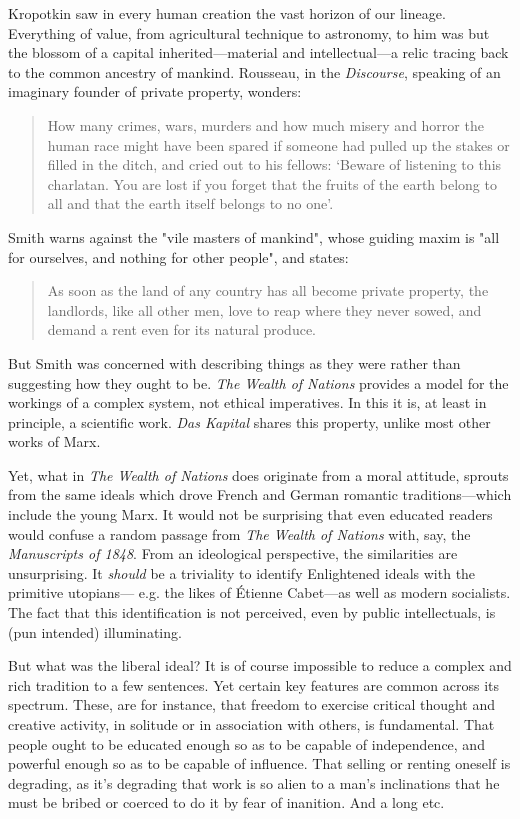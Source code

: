 \documentclass[a4paper]{article}
\begin{document}
Kropotkin saw in every human creation the vast horizon of our lineage.
Everything of value, from agricultural technique to astronomy, to him was but
the blossom of a capital inherited---material and intellectual---a relic
tracing back to the common ancestry of mankind. Rousseau, in the
\textit{Discourse}, speaking of an imaginary founder of private property,
wonders:

\begin{quote}
    How many crimes, wars, murders and how much misery and horror the human
    race might have been spared if someone had pulled up the stakes or filled
    in the ditch, and cried out to his fellows: ‘Beware of listening to this
    charlatan. You are lost if you forget that the fruits of the earth belong
    to all and that the earth itself belongs to no one’.
\end{quote}

Smith warns against  the "vile masters of mankind", whose guiding maxim is "all
for ourselves, and nothing for other people", and states:

\begin{quote}
    As soon as the land of any country has all become private property, the
    landlords, like all other men, love to reap where they never sowed, and
    demand a rent even for its natural produce.
\end{quote}

But Smith was concerned with describing things as they were rather than
suggesting how they ought to be. \textit{The Wealth of Nations} provides a
model for the workings of a complex system, not ethical imperatives. In this it
is, at least in principle, a scientific work. \textit{Das Kapital} shares this
property, unlike most other works of Marx.

Yet, what in \textit{The Wealth of Nations} does originate from a moral
attitude, sprouts from the same ideals which drove French and German
romantic traditions---which include the young Marx. It would not be surprising that
even educated readers would confuse a random passage from \textit{The Wealth of
Nations} with, say, the \textit{Manuscripts of 1848}. From an ideological
perspective, the similarities are unsurprising. It \textit{should} be a
triviality to identify Enlightened ideals with the primitive utopians--- e.g. the
likes of Étienne Cabet---as well as modern socialists. The fact that this
identification is not perceived, even by public intellectuals, is (pun
intended) illuminating.

But what was the liberal ideal? It is of course impossible to reduce a complex
and rich tradition to a few sentences. Yet certain key features are common
across its spectrum. These, are for instance, that freedom to exercise critical
thought and creative activity, in solitude or in association with others, is
fundamental. That people ought to be educated enough so as to be capable of
independence, and powerful enough so as to be capable of influence. That
selling or renting oneself is degrading, as it's degrading that work is so
alien to a man's inclinations that he must be bribed or coerced to do
it by fear of inanition. And a long etc. 
\end{document}
